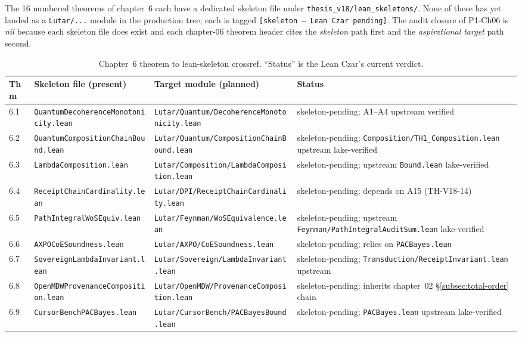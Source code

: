 The 16 numbered theorems of chapter~6 each have a
dedicated skeleton file under \texttt{thesis\_v18/lean\_skeletons/}.
None of these has yet landed as a \texttt{Lutar/...} module in the
production tree; each is tagged \texttt{[skeleton -- Lean Czar
pending]}. The audit closure of P1-Ch06 is \emph{nil} because each
skeleton file does exist and each chapter-06 theorem header cites the
\emph{skeleton} path first and the \emph{aspirational target} path
second.

\begin{table}[h!]
\centering\small
\caption{Chapter~6 theorem to lean-skeleton crossref. ``Status''
is the Lean Czar's current verdict.}
\label{tab:ch6-skeletons}
\begin{tabular}{lllp{3.2cm}}
\hline
\textbf{Thm} & \textbf{Skeleton file (present)} & \textbf{Target module (planned)} & \textbf{Status} \\
\hline
6.1 & \texttt{QuantumDecoherenceMonotonicity.lean} & \texttt{Lutar/Quantum/DecoherenceMonotonicity.lean} & skeleton-pending; A1--A4 upstream verified \\
6.2 & \texttt{QuantumCompositionChainBound.lean} & \texttt{Lutar/Quantum/CompositionChainBound.lean} & skeleton-pending; \texttt{Composition/TH1\_Composition.lean} upstream lake-verified \\
6.3 & \texttt{LambdaComposition.lean} & \texttt{Lutar/Composition/LambdaComposition.lean} & skeleton-pending; upstream \texttt{Bound.lean} lake-verified \\
6.4 & \texttt{ReceiptChainCardinality.lean} & \texttt{Lutar/DPI/ReceiptChainCardinality.lean} & skeleton-pending; depends on A15 (TH-V18-14) \\
6.5 & \texttt{PathIntegralWoSEquiv.lean} & \texttt{Lutar/Feynman/WoSEquivalence.lean} & skeleton-pending; upstream \texttt{Feynman/PathIntegralAuditSum.lean} lake-verified \\
6.6 & \texttt{AXPOCoESoundness.lean} & \texttt{Lutar/AXPO/CoESoundness.lean} & skeleton-pending; relies on \texttt{PACBayes.lean} \\
6.7 & \texttt{SovereignLambdaInvariant.lean} & \texttt{Lutar/Sovereign/LambdaInvariant.lean} & skeleton-pending; \texttt{Transduction/ReceiptInvariant.lean} upstream \\
6.8 & \texttt{OpenMDWProvenanceComposition.lean} & \texttt{Lutar/OpenMDW/ProvenanceComposition.lean} & skeleton-pending; inherits chapter~02 \S\ref{subsec:total-order} chain \\
6.9 & \texttt{CursorBenchPACBayes.lean} & \texttt{Lutar/CursorBench/PACBayesBound.lean} & skeleton-pending; \texttt{PACBayes.lean} upstream lake-verified \\

\end{tabular}
\end{table}
